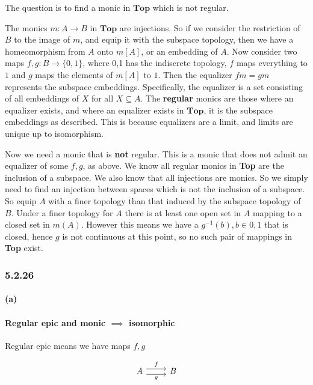 \documentclass{article}
\begin{document}
The question is to find a monic in $\mathbf{Top}$ which is not regular.

The monics $m: A \rightarrow B$ in $\mathbf{Top}$ are injections. So if we consider the restriction of $B$ to the image of $m$, and equip it with the subspace topology, then we have a homeomorphism from $A$ onto $m[A]$, or an embedding of $A$.   Now consider two maps $f,g: B \rightarrow \{0,1\}$, where {0,1} has the indiscrete topology, $f$ maps everything to $1$ and $g$ maps the elements of $m[A]$ to $1$. Then the equalizer $fm=gm$ represents the subspace embeddings. Specifically, the equalizer is a set consisting of all embeddings of $X$ for all $X \subseteq A$. The \textbf{regular} monics are those where an equalizer exists, and where an equalizer exists in $\mathbf{Top}$, it is the subspace embeddings as described. This is because equalizers are a limit, and limits are unique up to isomorphism.

Now we need a monic that is \textbf{not} regular. This is a monic that does not admit an equalizer of some $f, g$, as above. We know all regular monics in \textbf{Top} are the inclusion of a subspace. We also know that all injections are monics. So we simply need to find an injection between spaces which is not the inclusion of a subspace.
So equip $A$ with a finer topology than that induced by the subspace topology of $B$. Under a finer topology for $A$ there is at least one open set in $A$ mapping to a closed set in $m(A)$. However this means we have a $g^{-1}(b), b \in {0, 1}$ that is closed, hence $g$ is not continuous at this point, so no such pair of mappings in \textbf{Top} exist.

\subsubsection*{5.2.26}
\paragraph{(a)}

\paragraph{Regular epic and monic $\implies$ isomorphic}
Regular epic means we have maps $f, g$

\begin{equation*}
\label{eqn5143}
\begin{tikzcd}
 A \ar[r,shift left=.75ex,"f"]
   \ar[r,shift right=.75ex,swap,"g"] & B
\end{tikzcd}
\end{equation*}
\end{document}

